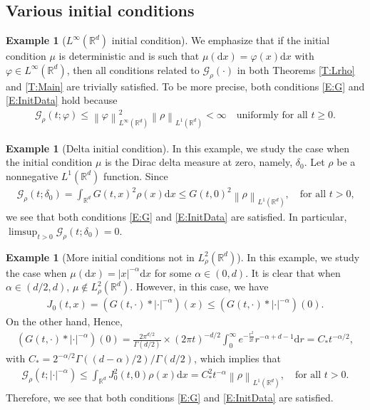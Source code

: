 \documentclass[12pt]{report}
\theoremstyle{plain}
\theoremstyle{definition}
\newtheorem{example}[theorem]{Example}
\numberwithin{equation}{section}
\newcommand{\R}{\mathbb{R}}
\newcommand{\Norm}[1]{\left\|  #1   \right\|}
\newcommand{\ud}{\ensuremath{ \mathrm{d} }}
\begin{document}
\subsection{Various initial conditions} \label{SS:Init}

\begin{example}[$L^\infty(\R^d)$ initial condition] \label{Ex:BddInit}
	We emphasize that if the initial condition $\mu$ is deterministic and is such that $\mu(\ud x) =
	\varphi(x)\ud x$ with $\varphi\in L^\infty(\R^d)$, then all conditions related to
	$\mathcal{G}_\rho(\cdot)$ in both Theorems \ref{T:Lrho} and \ref{T:Main} are trivially satisfied.
	To be more precise, both conditions \eqref{E:G} and \eqref{E:InitData} hold because
	\begin{align*}
	\mathcal{G}_\rho(t;\varphi) \le \Norm{\varphi}_{L^\infty(\R^d)}^2 \Norm{\rho}_{L^1(\R^d)}< \infty
	\quad \text{uniformly for all $t\ge 0$.}
	\end{align*}
\end{example}

\begin{example}[Delta initial condition] \label{Ex:delta}
	In this example, we study the case when the initial condition $\mu$ is the Dirac delta measure at
	zero, namely, $\delta_0$. Let $\rho$ be a nonnegative $L^1(\R^d)$ function. Since
	\begin{align*}
	\mathcal{G}_\rho(t;\delta_0)
	= \int_{\R^d} G(t,x)^2 \rho(x) \ud x
	\le G(t,0)^2 \Norm{\rho}_{L^1(\R^d)},
	\quad \text{for all $t>0$,}
	\end{align*}
	we see that both conditions \eqref{E:G} and \eqref{E:InitData} are satisfied. In particular,
	$\limsup_{t>0} \mathcal{G}_\rho(t;\delta_0)=0$.
\end{example}


\begin{example}[More initial conditions not in $L_\rho^2(\R^d)$] \label{Ex:Riesz}
	In this example, we study the case when $\mu(\ud x) = |x|^{-\alpha}\ud x$ for some $\alpha\in
	(0,d)$. It is clear that when $\alpha\in (d/2,d)$, $\mu\not\in L_\rho^2(\R^d)$. However, in this
	case, we have
	\begin{align*}
	J_0(t,x) = \left(G(t,\cdot)* |\cdot|^{-\alpha}\right)(x)
	\le \left(G(t,\cdot)* |\cdot|^{-\alpha}\right)(0).
	\end{align*}
	On the other hand,
	Hence,
	\begin{align*}
	\left(G(t,\cdot)* |\cdot|^{-\alpha}\right)(0)
	= \frac{2\pi^{d/2}}{\Gamma(d/2)}\times (2\pi t)^{-d/2} \int_0^\infty e^{-\frac{r^2}{2t}} r^{-\alpha + d-1} \ud r = C_* t^{-\alpha/2},
	\end{align*}
	with $C_*=2^{-\alpha/2}\Gamma\left((d-\alpha)/2\right)/\Gamma(d/2)$, which implies that
	\begin{align*}
	\mathcal{G}_\rho\left(t;|\cdot|^{-\alpha}\right)
	\le \int_{\R^d} J_0^2(t,0) \rho(x) \ud x
	= C_*^2 t^{-\alpha} \Norm{\rho}_{L^1(\R^d)},
	\quad \text{for all $t>0$.}
	\end{align*}
	Therefore, we see that both conditions \eqref{E:G} and \eqref{E:InitData} are satisfied.
\end{example}
\end{document}
